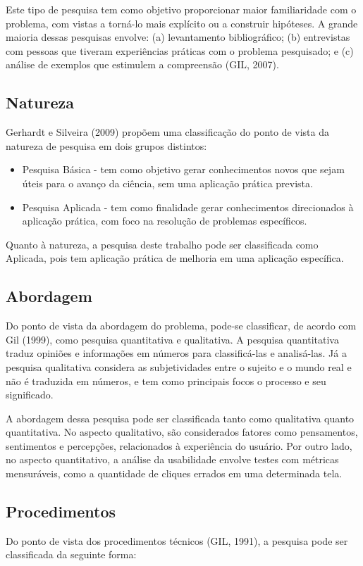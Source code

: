 Este tipo de pesquisa tem como objetivo proporcionar maior familiaridade com o problema, com vistas a torná-lo mais explícito ou a construir hipóteses. A grande maioria dessas pesquisas envolve: (a) levantamento 
bibliográfico; (b) 	entrevistas com pessoas que tiveram experiências práticas com o problema pesquisado; e (c) análise de exemplos que estimulem a compreensão (GIL, 2007).

\subsection{Natureza}
\label{sec:Natureza}
Gerhardt e Silveira (2009) propõem uma classificação do ponto de vista da natureza de pesquisa em dois grupos distintos:

\begin{itemize}
	\item Pesquisa Básica - tem como objetivo gerar conhecimentos novos que sejam úteis para o avanço da ciência, sem uma aplicação prática prevista.
	\item Pesquisa Aplicada - tem como finalidade gerar conhecimentos direcionados à aplicação prática, com foco na resolução de problemas específicos.
\end{itemize}

Quanto à natureza, a pesquisa deste trabalho pode ser classificada como Aplicada, pois tem aplicação prática de melhoria em uma aplicação específica.

\subsection{Abordagem}
\label{sec:Abordagem}
Do ponto de vista da abordagem do problema, pode-se classificar, de acordo com Gil (1999), como pesquisa quantitativa e qualitativa. A pesquisa quantitativa traduz opiniões e informações em números para classificá-las e analisá-las. 
Já a pesquisa qualitativa considera as subjetividades entre o sujeito e o mundo real e não é traduzida em números, e tem como principais focos o processo e seu significado.

A abordagem dessa pesquisa pode ser classificada tanto como qualitativa quanto quantitativa. No aspecto qualitativo, são considerados fatores como pensamentos, sentimentos e percepções, relacionados à experiência 
do usuário. Por outro lado, no aspecto quantitativo, a análise da usabilidade envolve testes com métricas mensuráveis, como a quantidade de cliques errados em uma determinada tela.

\subsection{Procedimentos}
\label{sec:Procedimentos}
Do ponto de vista dos procedimentos técnicos (GIL, 1991), a pesquisa pode ser classificada da seguinte forma:

